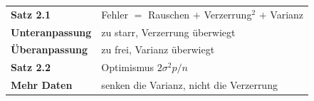 \begin{merksatz}
\begin{center}
\renewcommand{\arraystretch}{1.5}
\begin{tabular}{@{}P{3.0cm}P{5.6cm}@{}}
\toprule
\textbf{Satz 2.1} & Fehler $=$ Rauschen $+$ Verzerrung$^{2}$ $+$ Varianz\\
\textbf{Unteranpassung} & zu starr, Verzerrung überwiegt\\
\textbf{Überanpassung} & zu frei, Varianz überwiegt\\
\textbf{Satz 2.2} & Optimismus $2\sigma^{2}p/n$\\
\textbf{Mehr Daten} & senken die Varianz, nicht die Verzerrung\\
\bottomrule
\end{tabular}
\end{center}

\begin{center}
\begin{minipage}{0.88\textwidth}
\end{minipage}
\end{center}
\end{merksatz}
